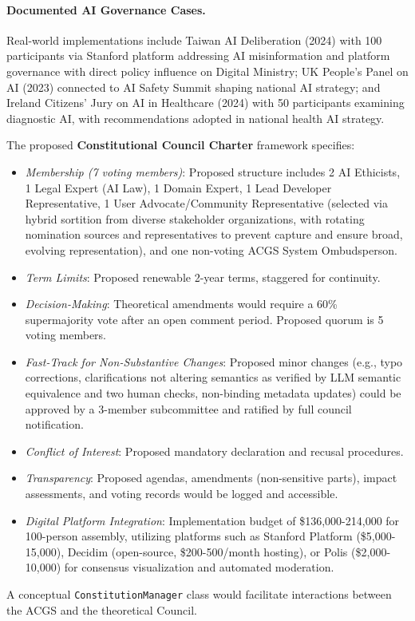 \documentclass[manuscript,screen,9pt]{acmart}
\begin{document}
\begin{table}[!htb]
\paragraph{Documented AI Governance Cases.} Real-world implementations include Taiwan AI Deliberation (2024) with 100 participants via Stanford platform addressing AI misinformation and platform governance with direct policy influence on Digital Ministry; UK People's Panel on AI (2023) connected to AI Safety Summit shaping national AI strategy; and Ireland Citizens' Jury on AI in Healthcare (2024) with 50 participants examining diagnostic AI, with recommendations adopted in national health AI strategy.

The proposed \textbf{Constitutional Council Charter} framework specifies:
\begin{itemize}[leftmargin=*,itemsep=1pt,parsep=1pt]
    \item \textit{Membership (7 voting members)}: Proposed structure includes 2 AI Ethicists, 1 Legal Expert (AI Law), 1 Domain Expert, 1 Lead Developer Representative, 1 User Advocate/Community Representative (selected via hybrid sortition from diverse stakeholder organizations, with rotating nomination sources and representatives to prevent capture and ensure broad, evolving representation), and one non-voting ACGS System Ombudsperson.
    \item \textit{Term Limits}: Proposed renewable 2-year terms, staggered for continuity.
    \item \textit{Decision-Making}: Theoretical amendments would require a 60\% supermajority vote after an open comment period. Proposed quorum is 5 voting members.
    \item \textit{Fast-Track for Non-Substantive Changes}: Proposed minor changes (e.g., typo corrections, clarifications not altering semantics as verified by LLM semantic equivalence and two human checks, non-binding metadata updates) could be approved by a 3-member subcommittee and ratified by full council notification.
    \item \textit{Conflict of Interest}: Proposed mandatory declaration and recusal procedures.
    \item \textit{Transparency}: Proposed agendas, amendments (non-sensitive parts), impact assessments, and voting records would be logged and accessible.
    \item \textit{Digital Platform Integration}: Implementation budget of \$136,000-214,000 for 100-person assembly, utilizing platforms such as Stanford Platform (\$5,000-15,000), Decidim (open-source, \$200-500/month hosting), or Polis (\$2,000-10,000) for consensus visualization and automated moderation.
\end{itemize}
A conceptual \texttt{ConstitutionManager} class would facilitate interactions between the ACGS and the theoretical Council.


\end{table}
\end{document}
